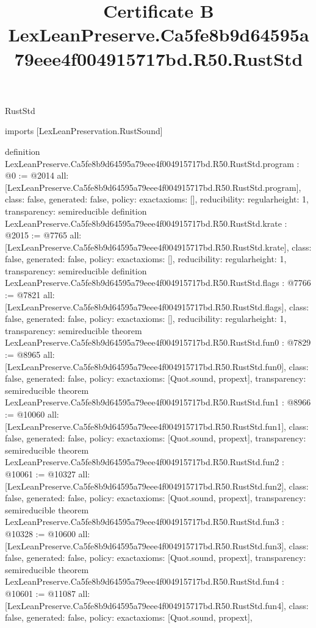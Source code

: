 \begin{lexlean}{RustStd}
\title{Certificate B LexLeanPreserve.Ca5fe8b9d64595a79eee4f004915717bd.R50.RustStd}
\begin{coremodule}
imports [LexLeanPreservation.RustSound]

definition LexLeanPreserve.Ca5fe8b9d64595a79eee4f004915717bd.R50.RustStd.program : @0 := @2014 {
  all: [LexLeanPreserve.Ca5fe8b9d64595a79eee4f004915717bd.R50.RustStd.program],
  class: false,
  generated: false,
  policy: exact{axioms: []},
  reducibility: regular{height: 1},
  transparency: semireducible
}
definition LexLeanPreserve.Ca5fe8b9d64595a79eee4f004915717bd.R50.RustStd.krate : @2015 := @7765 {
  all: [LexLeanPreserve.Ca5fe8b9d64595a79eee4f004915717bd.R50.RustStd.krate],
  class: false,
  generated: false,
  policy: exact{axioms: []},
  reducibility: regular{height: 1},
  transparency: semireducible
}
definition LexLeanPreserve.Ca5fe8b9d64595a79eee4f004915717bd.R50.RustStd.flags : @7766 := @7821 {
  all: [LexLeanPreserve.Ca5fe8b9d64595a79eee4f004915717bd.R50.RustStd.flags],
  class: false,
  generated: false,
  policy: exact{axioms: []},
  reducibility: regular{height: 1},
  transparency: semireducible
}
theorem LexLeanPreserve.Ca5fe8b9d64595a79eee4f004915717bd.R50.RustStd.fun0 : @7829 := @8965 {
  all: [LexLeanPreserve.Ca5fe8b9d64595a79eee4f004915717bd.R50.RustStd.fun0],
  class: false,
  generated: false,
  policy: exact{axioms: [Quot.sound, propext]},
  transparency: semireducible
}
theorem LexLeanPreserve.Ca5fe8b9d64595a79eee4f004915717bd.R50.RustStd.fun1 : @8966 := @10060 {
  all: [LexLeanPreserve.Ca5fe8b9d64595a79eee4f004915717bd.R50.RustStd.fun1],
  class: false,
  generated: false,
  policy: exact{axioms: [Quot.sound, propext]},
  transparency: semireducible
}
theorem LexLeanPreserve.Ca5fe8b9d64595a79eee4f004915717bd.R50.RustStd.fun2 : @10061 := @10327 {
  all: [LexLeanPreserve.Ca5fe8b9d64595a79eee4f004915717bd.R50.RustStd.fun2],
  class: false,
  generated: false,
  policy: exact{axioms: [Quot.sound, propext]},
  transparency: semireducible
}
theorem LexLeanPreserve.Ca5fe8b9d64595a79eee4f004915717bd.R50.RustStd.fun3 : @10328 := @10600 {
  all: [LexLeanPreserve.Ca5fe8b9d64595a79eee4f004915717bd.R50.RustStd.fun3],
  class: false,
  generated: false,
  policy: exact{axioms: [Quot.sound, propext]},
  transparency: semireducible
}
theorem LexLeanPreserve.Ca5fe8b9d64595a79eee4f004915717bd.R50.RustStd.fun4 : @10601 := @11087 {
  all: [LexLeanPreserve.Ca5fe8b9d64595a79eee4f004915717bd.R50.RustStd.fun4],
  class: false,
  generated: false,
  policy: exact{axioms: [Quot.sound, propext]},
}
\end{coremodule}
\end{lexlean}
